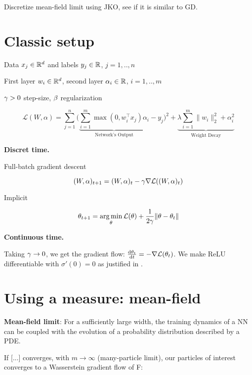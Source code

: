 Discretize mean-field limit using JKO, see if it is similar to GD.


\section{Classic setup}

Data $x_j \in \mathbb{R}^d$ and labels $y_j \in \mathbb{R}$, $j=1,..,n$

First layer $w_i \in \mathbb{R}^d$, second layer $\alpha_i \in \mathbb{R}$, $i=1,..,m$

$\gamma>0$ step-size, $\beta$ regularization

\begin{equation}
	 \mathcal{L}(W, \alpha) = \sum_{j=1}^n \bigg( \underbrace{\sum_{i=1}^m \max(0, w_i^\top x_j) \alpha_i}_{\text{Network's Output}} - y_j \bigg)^2 + \underbrace{\lambda \sum_{i=1}^m \| w_i \|^2_2 + \alpha_i^2}_{\text{Weight Decay}}
\end{equation}


\textbf{Discret time.}

Full-batch gradient descent

\begin{equation}
	(W, \alpha)_{t+1} = (W, \alpha)_t - \gamma \nabla \mathcal{L}((W, \alpha)_t)
\end{equation}

Implicit

\begin{equation}
	\theta_{t+1} = \operatorname*{arg\,min}_{\theta} \mathcal{L}(\theta) +\frac{1}{2\gamma} \lVert\theta - \theta_t\rVert
\end{equation}

\textbf{Continuous time.}

Taking $\gamma \to 0$, we get the gradient flow: $\frac{\mathrm{d} \theta_t}{\mathrm{d} t} = - \nabla \mathcal{L}(\theta_t)$. We make ReLU differentiable with $\sigma'(0)=0$ as justified in \citep{boursierGradientFlowDynamics2022}.

\section{Using a measure: mean-field}

\textbf{Mean-field limit}\citep{chizatGlobalConvergenceGradient2018}: For a sufficiently large width, the training dynamics of a NN can be coupled with the evolution of a probability distribution described by a PDE.

If [...] converges, with $m \rightarrow \infty$ (many-particle limit), our particles of interest converges to a Wasserstein gradient flow of F:

